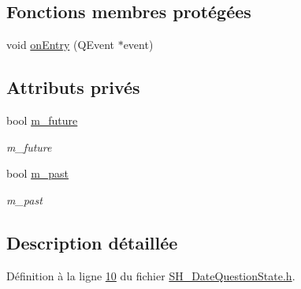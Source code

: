 \subsection*{Fonctions membres protégées}
\begin{DoxyCompactItemize}
\item 
void \hyperlink{classSH__GenericState_a7c30692635023ce7cf65e5ba5bb18a9c}{on\-Entry} (Q\-Event $\ast$event)
\end{DoxyCompactItemize}
\subsection*{Attributs privés}
\begin{DoxyCompactItemize}
\item 
bool \hyperlink{classSH__DateQuestionState_a0a1577dc70f9c1120a6d623f8eb635c8}{m\-\_\-future}
\begin{DoxyCompactList}\small\item\em m\-\_\-future \end{DoxyCompactList}\item 
bool \hyperlink{classSH__DateQuestionState_afa33fd208cf539167bcc26c83e57d803}{m\-\_\-past}
\begin{DoxyCompactList}\small\item\em m\-\_\-past \end{DoxyCompactList}\end{DoxyCompactItemize}


\subsection{Description détaillée}


Définition à la ligne \hyperlink{SH__DateQuestionState_8h_source_l00010}{10} du fichier \hyperlink{SH__DateQuestionState_8h_source}{S\-H\-\_\-\-Date\-Question\-State.\-h}.



